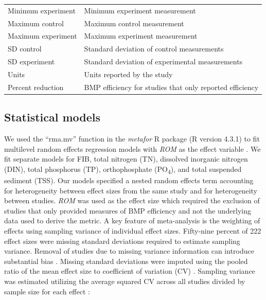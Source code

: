 \documentclass[utf8]{FrontiersinHarvard}
\begin{document}
\begin{table}
\begin{tabular}[t]{>{\raggedright\arraybackslash}p{10em}>{\raggedright\arraybackslash}p{25em}}
Minimum experiment & Minimum experiment measurement\\
Maximum control & Maximum control measurement\\
Maximum experiment & Maximum experiment measurement\\
\addlinespace
SD control & Standard deviation of control measurements\\
SD experiment & Standard deviation of experimental measurements\\
Units & Units reported by the study\\
Percent reduction & BMP efficiency for studies that only reported efficiency\\
\bottomrule
\end{tabular}
\end{table}

\hypertarget{statistical-models}{%
\subsection{Statistical models}\label{statistical-models}}

We used the ``rma.mv'' function in the \emph{metafor} R package (R version 4.3.1) to fit multilevel random effects regression models with \emph{ROM} as the effect variable \citep{viechtbauerConductingMetaanalysesMetafor2010, rcoreteamLanguageEnvironmentStatistical2023}.
We fit separate models for FIB, total nitrogen (TN), dissolved inorganic nitrogen (DIN), total phosphorus (TP), orthophosphate (PO\textsubscript{4}), and total suspended sediment (TSS).
Our models specified a nested random effects term accounting for heterogeneity between effect sizes from the same study and for heterogeneity between studies.
\emph{ROM} was used as the effect size which required the exclusion of studies that only provided measures of BMP efficiency and not the underlying data used to derive the metric.
A key feature of meta-analysis is the weighting of effects using sampling variance of individual effect sizes.
Fifty-nine percent of 222 effect sizes were missing standard deviations required to estimate sampling variance.
Removal of studies due to missing variance information can introduce substantial bias \citep{kambachConsequencesMultipleImputation2020}.
Missing standard deviations were imputed using the pooled ratio of the mean effect size to coefficient of variation (CV) \citep{brackenStatisticalMethodsAnalysis1992}.
Sampling variance was estimated utilizing the average squared CV across all studies divided by sample size for each effect \citep{nakagawaRobustReadilyImplementable2023, doncasterCorrectionBiasMeta2018}:
\end{document}
